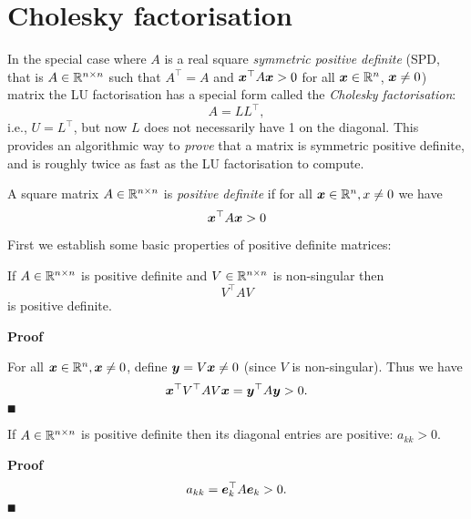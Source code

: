 
\section{Cholesky factorisation}
In the special case where $A$ is  a real square \emph{symmetric positive definite} (SPD, that is $A \in {\mathbb R}^{n \times n}$ such that $A^\ensuremath{\top} = A$ and $\bm{{\mbox{\boldmath$x$\unboldmath}}}^\top A \bm{{\mbox{\boldmath$x$\unboldmath}}} > 0$ for all $\bm{{\mbox{\boldmath$x$\unboldmath}}} \in {\mathbb R}^n$, $\bm{{\mbox{\boldmath$x$\unboldmath}}} \neq 0$) matrix the LU factorisation has a special form called the \emph{Cholesky factorisation}:
\[
A = L L^\ensuremath{\top},
\]
i.e., $U = L^\ensuremath{\top}$, but now $L$ does not necessarily have 1 on the diagonal. This provides an algorithmic way to \emph{prove} that a matrix is symmetric positive definite, and is roughly twice as fast as the LU factorisation to compute.

\begin{definition} A square matrix $A \in {\mathbb R}^{n \times n}$ is \emph{positive definite} if for all $\bm{{\mbox{\boldmath$x$\unboldmath}}} \in {\mathbb R}^n, x \neq 0$ we have
\[
\bm{{\mbox{\boldmath$x$\unboldmath}}}^\top A \bm{{\mbox{\boldmath$x$\unboldmath}}} > 0
\]
\end{definition}

First we establish some basic properties of positive definite matrices:

\begin{proposition} If  $A \in {\mathbb R}^{n \times n}$ is positive definite and $V \in {\mathbb R}^{n \times n}$ is non-singular then
\[
V^\ensuremath{\top} A V
\]
is positive definite. \end{proposition}
\textbf{Proof}

For all  $\bm{{\mbox{\boldmath$x$\unboldmath}}} \in {\mathbb R}^n, \bm{{\mbox{\boldmath$x$\unboldmath}}} \neq 0$, define $\bm{{\mbox{\boldmath$y$\unboldmath}}} = V \bm{{\mbox{\boldmath$x$\unboldmath}}} \neq 0$ (since $V$ is non-singular). Thus we have
\[
\bm{{\mbox{\boldmath$x$\unboldmath}}}^\top V^\top A V \bm{{\mbox{\boldmath$x$\unboldmath}}} = \bm{{\mbox{\boldmath$y$\unboldmath}}}^\top A \bm{{\mbox{\boldmath$y$\unboldmath}}} > 0.
\]
\ensuremath{\QED}

\begin{proposition} If $A \in {\mathbb R}^{n \times n}$ is positive definite then its diagonal entries are positive: $a_{kk} > 0$. \end{proposition}
\textbf{Proof}
\[
a_{kk} = \bm{{\mbox{\boldmath$e$\unboldmath}}}_k^\top A \bm{{\mbox{\boldmath$e$\unboldmath}}}_k > 0.
\]
\ensuremath{\QED}

